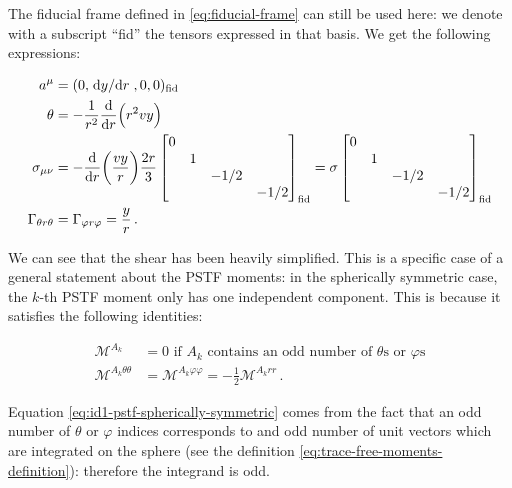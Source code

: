 \documentclass[main.tex]{subfiles}
\begin{document}
The fiducial frame defined in \eqref{eq:fiducial-frame} can still be used here: we  denote with a subscript ``fid'' the tensors expressed in that basis. We get the following expressions:

\begin{subequations} \label{eq:spherical-coordinates-simplifications}
\begin{align}
  a^\mu &= (0,\dv*{y}{r},0,0)_{\text{fid}} \\
  \theta &= - \frac{1}{r^2} \dv{}{r} \qty(r^2 v y)  \\
  \sigma_{\mu\nu} &= - \dv{}{r} \qty(\frac{vy}{r}) \frac{2r}{3} \begin{bmatrix}
  0   &   &   &  \\
     &  1 &   &  \\
     &   & -1/2  &  \\
     &   &   & -1/2
  \end{bmatrix} _{\text{fid}}
  = \sigma \begin{bmatrix}
  0   &   &   &  \\
     &  1 &   &  \\
     &   & -1/2  &  \\
     &   &   & -1/2
  \end{bmatrix} _{\text{fid}} \\
  \Gamma_{\theta r \theta} &= \Gamma_{\varphi r \varphi} = \frac{y}{r}\,.
\end{align}
\end{subequations}

We can see that the shear has been heavily simplified. This is a specific case of a general statement about the PSTF moments: in the spherically symmetric case, the \(k\)-th PSTF moment only has one independent component. This is because it satisfies the following identities:

\begin{subequations}
\begin{align}
  \mathscr M ^{A_k} &= 0 \text{ if } A_k \text{ contains an odd number of } \theta \text{s or } \varphi \text{s}  \label{eq:id1-pstf-spherically-symmetric}  \\
  \mathscr M ^{A_k \theta \theta} &= \mathscr M ^{A_k \varphi \varphi} = -\frac{1}{2} \mathscr M ^{A_k rr} \,. \label{eq:id2-pstf-spherically-symmetric}
\end{align}
\end{subequations}

Equation \eqref{eq:id1-pstf-spherically-symmetric} comes from the fact that an odd number of \(\theta\) or \(\varphi\) indices corresponds to and odd number of unit vectors which are integrated on the sphere (see the definition \eqref{eq:trace-free-moments-definition}): therefore the integrand is odd.
\end{document}
